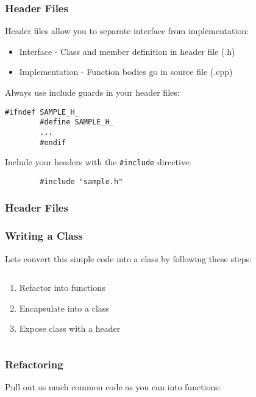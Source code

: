 \begin{frame}[fragile]
	\frametitle{Header Files}
	Header files allow you to separate interface from implementation:
	\begin{itemize}
		\item Interface - Class and member definition in header file (.h)
		\item Implementation - Function bodies go in source file (.cpp)
	\end{itemize}
	\vfill
	Always use include guards in your header files:
	\begin{lstlisting}[title=sample.h]
		#ifndef SAMPLE_H_
		#define SAMPLE_H_
		...
		#endif
	\end{lstlisting}
	\vfill
	Include your headers with the \texttt{\#include} directive:
	\begin{lstlisting}
		#include "sample.h"
	\end{lstlisting}
\end{frame}

\begin{frame}
	\frametitle{Header Files}
	
	
\end{frame}

\begin{frame}[fragile]
	\frametitle{Writing a Class}
	Lets convert this simple code into a class by following these steps:
	\begin{columns}[T]
		\begin{column}{0.5\textwidth}
			\begin{enumerate}
				\item Refactor into functions
				\bigskip
				\item Encapsulate into a class
				\bigskip
				\item Expose class with a header
			\end{enumerate}
		\end{column}
		\begin{column}{0.5\textwidth}
			
		\end{column}
	\end{columns}
\end{frame}

\begin{frame}[fragile]
	\frametitle{Refactoring}
	Pull out as much common code as you can into functions:
	
\end{frame}

